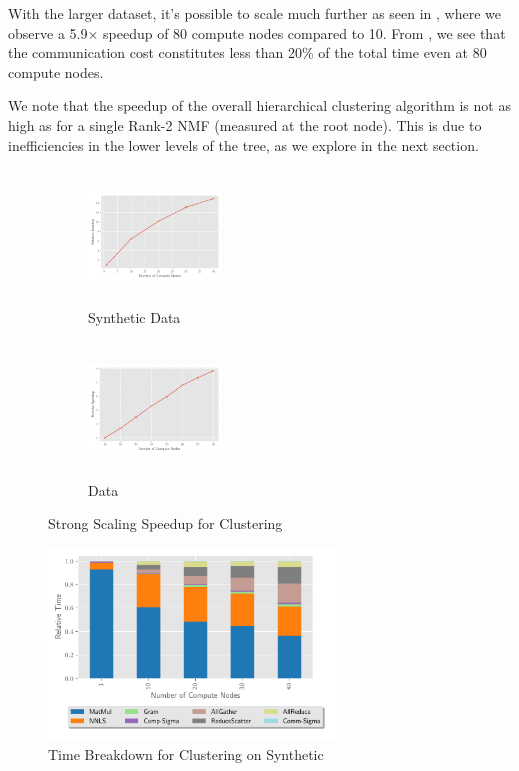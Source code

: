 With the larger \image{} dataset, it's possible to scale much further as seen in , where we observe a 5.9$\times$ speedup of 80 compute nodes compared to 10.
From , we see that the communication cost constitutes less than 20\% of the total time even at 80 compute nodes. 

We note that the speedup of the overall hierarchical clustering algorithm is not as high as for a single Rank-2 NMF (measured at the root node).
This is due to inefficiencies in the lower levels of the tree, as we explore in the next section.


\begin{figure}
\centering
\begin{subfigure}{1.5in}
\begin{center}
\includegraphics[height=1.4in, width=1.4in]{plots/synthetic_hierarchical_speedup.pdf}
\caption{Synthetic Data}
\label{fig:synhierspeedup}
\end{center}
\end{subfigure}
\begin{subfigure}{1.5in}
\begin{center}
\includegraphics[height=1.4in, width=1.4in]{plots/realworld_hierarchical_speedup.pdf}
\caption{\image{} Data}
\label{fig:rwhierspeedup}
\end{center}
\end{subfigure}
\caption{Strong Scaling Speedup for Clustering}
\label{fig:rank2speedup}
\end{figure}

\begin{figure}
\begin{center}
\includegraphics[height=2in, width=\columnwidth]{plots/synthetic_hier_strongscaling.pdf}
\caption{Time Breakdown for Clustering on Synthetic}
\label{fig:synhierstrongscaling}
\end{center}
\end{figure}


